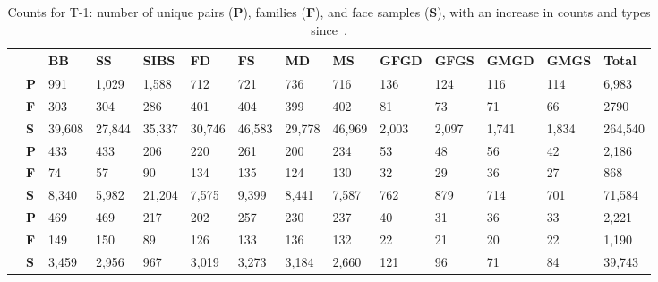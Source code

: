\begin{table*}[t!]
    \centering
   
    \caption{Counts for T-1: number of unique pairs (\textbf{P}), families (\textbf{F}), and face samples (\textbf{S}), with an increase in counts and types since~\cite{robinson2017recognizing}.}
    \scriptsize
    \begin{adjustbox}{width=\linewidth}
    \begin{tabular}{p{.1in}m{.1in}m{.29in}m{.29in}m{.29in}m{.29in}m{.29in}m{.29in}m{.29in}m{.29in}m{.29in}m{.29in}m{.29in}|m{.29in}}
    & & BB& SS&SIBS& FD &FS & MD &MS & GFGD & GFGS &GMGD & GMGS& Total\\\hline
     \parbox[t]{2mm}{}&\textbf{P} & 991  & 1,029 &1,588 & 712 & 721& 736& 716 & 136 & 124 & 116 & 114 &6,983\\
     &\textbf{F}  &303 & 304 & 286 & 401 & 404 & 399 & 402 & 81 & 73&71 & 66 &2790\\
     &\textbf{S} &39,608& 27,844 & 35,337& 30,746  &46,583 & 29,778&  46,969& 2,003 &  2,097  &1,741 & 1,834  &264,540\\\hline
    
    \parbox[t]{2mm}{} &\textbf{P}  & 433 & 433 & 206& 220 & 261 & 200 & 234 & 53 & 48 & 56 & 42 & 2,186 \\
    
     &\textbf{F}  &74  & 57& 90 & 134& 135& 124& 130& 32& 29& 36&27 &868\\
     &\textbf{S}  & 8,340 & 5,982 & 21,204& 7,575 &9,399&8,441 &7,587 & 762 &879 & 714 & 701 & 71,584\\\hline
    


    \parbox[t]{2mm}{} &\textbf{P}  &  469& 469 & 217 & 202& 257 & 230 & 237 & 40 & 31 & 36 & 33&2,221 \\
     &\textbf{F}  & 149  & 150  & 89 & 126 & 133 & 136 & 132 & 22 & 21 & 20 & 22 & 1,190\\
     &\textbf{S}  & 3,459 &2,956 &967 &3,019&3,273&3,184& 2,660 &121&96&71&84&39,743\\\hline
    
    \end{tabular}\label{tbl:track1:counts} 
    \end{adjustbox}
    \vspace{-5mm}
\end{table*}

